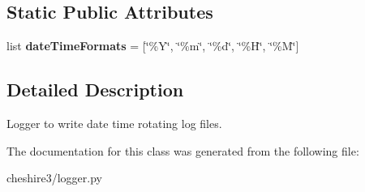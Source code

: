 \subsection*{Static Public Attributes}
\begin{DoxyCompactItemize}
\item 
\hypertarget{classcheshire3_1_1logger_1_1_date_time_file_logger_aa70698154ea8dfc616126d9420e21eee}{list {\bfseries date\-Time\-Formats} = \mbox{[}\char`\"{}\%Y\char`\"{}, \char`\"{}\%m\char`\"{}, \char`\"{}\%d\char`\"{}, \char`\"{}\%H\char`\"{}, \char`\"{}\%M\char`\"{}\mbox{]}}\label{classcheshire3_1_1logger_1_1_date_time_file_logger_aa70698154ea8dfc616126d9420e21eee}

\end{DoxyCompactItemize}


\subsection{Detailed Description}
\begin{DoxyVerb}Logger to write date time rotating log files.\end{DoxyVerb}
 

The documentation for this class was generated from the following file\-:\begin{DoxyCompactItemize}
\item 
cheshire3/logger.\-py\end{DoxyCompactItemize}
